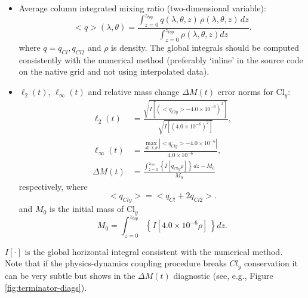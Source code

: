 \documentclass[times,doublespace]{fldauth}
\begin{document}
\begin{itemize}
\item Average column integrated mixing ratio (two-dimensional variable):
\begin{equation}
<q>(\lambda,\theta)=\frac{\int_{z=0}^{z_{top}} q(\lambda,\theta,z)\, \rho(\lambda,\theta,z)\, dz}{\int_{z=0}^{z_{top}} \rho(\lambda,\theta,z) dz}.
\end{equation}
where $q=q_{Cl},q_{Cl2}$ and $\rho$ is density. The global integrals should be computed consistently with the numerical method (preferably `inline' in the source code on the native grid and not using interpolated data).
\item $\ell_2(t)$, $\ell_\infty(t)$ and relative mass change $\Delta M(t)$ error norms for Cl$_y$:
\begin{align}
\ell_2(t)&=\frac{\sqrt{I\left[ \left(<q_{Cly}>-4.0\times 10^{-6}\right)^2\right] }}{\sqrt{I\left[\left(4.0\times 10^{-6}\right)^2\right]}},\\
\ell_\infty(t)&=\frac{\max_{\text{all }\lambda, \theta} |<q_{Cly}>-4.0\times 10^{-6}|}{4.0\times 10^{-6}},\\
\Delta M(t)&=\frac{\int_{z=0}^{z_{top}} \left\{ I\left[q_{Cly}\rho\right]\right\}\, dz -M_0}{M_0}
\end{align}
respectively, where
\begin{equation}
<q_{Cly}>=<q_{Cl}+2q_{Cl2}>.
\end{equation}
and $M_0$ is the initial mass of Cl$_y$
\begin{equation}
M_0=\int_{z=0}^{z_{top}} \left\{ I\left[4.0\times 10^{-6}\rho \right]\,  \right\} dz.
\end{equation}
\end{itemize}
$I\left[ \cdot \right]$ is the global horizontal integral consistent with the numerical method.\\

Note that if the physics-dynamics coupling procedure breaks $Cl_y$ conservation it can be very subtle but shows in the $\Delta M(t)$ diagnostic (see, e.g., Figure \ref{fig:terminator-diags}).
\end{document}
